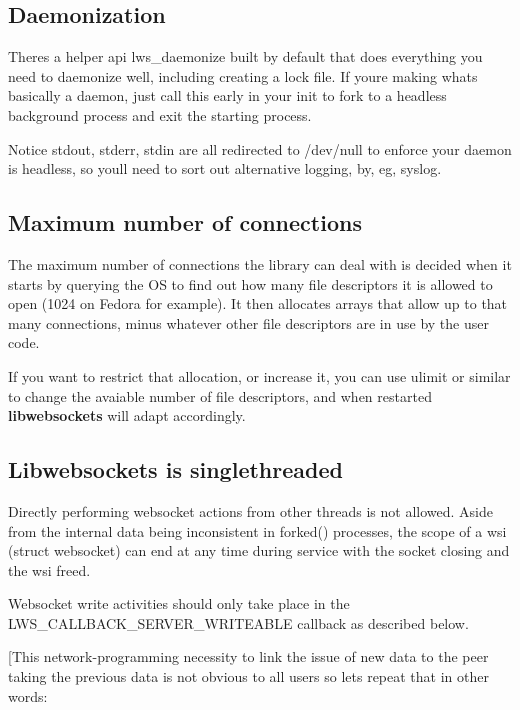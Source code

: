 \subsection*{Daemonization }

There\textquotesingle{}s a helper api {\ttfamily lws\+\_\+daemonize} built by default that does everything you need to daemonize well, including creating a lock file. If you\textquotesingle{}re making what\textquotesingle{}s basically a daemon, just call this early in your init to fork to a headless background process and exit the starting process.

Notice stdout, stderr, stdin are all redirected to /dev/null to enforce your daemon is headless, so you\textquotesingle{}ll need to sort out alternative logging, by, eg, syslog.

\subsection*{Maximum number of connections }

The maximum number of connections the library can deal with is decided when it starts by querying the OS to find out how many file descriptors it is allowed to open (1024 on Fedora for example). It then allocates arrays that allow up to that many connections, minus whatever other file descriptors are in use by the user code.

If you want to restrict that allocation, or increase it, you can use ulimit or similar to change the avaiable number of file descriptors, and when restarted {\bfseries libwebsockets} will adapt accordingly.

\subsection*{Libwebsockets is singlethreaded }

Directly performing websocket actions from other threads is not allowed. Aside from the internal data being inconsistent in {\ttfamily forked()} processes, the scope of a {\ttfamily wsi} ({\ttfamily struct websocket}) can end at any time during service with the socket closing and the {\ttfamily wsi} freed.

Websocket write activities should only take place in the {\ttfamily L\+W\+S\+\_\+\+C\+A\+L\+L\+B\+A\+C\+K\+\_\+\+S\+E\+R\+V\+E\+R\+\_\+\+W\+R\+I\+T\+E\+A\+B\+LE} callback as described below.

\mbox{[}This network-\/programming necessity to link the issue of new data to the peer taking the previous data is not obvious to all users so let\textquotesingle{}s repeat that in other words\+:

